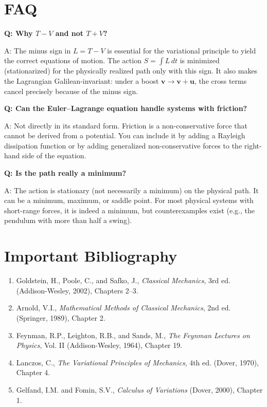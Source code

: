 \section*{FAQ}

\textbf{Q: Why $T - V$ and not $T + V$?}

A: The minus sign in $L = T - V$ is essential for the variational principle to yield the correct equations of motion. The action $S = \int L\,dt$ is minimized (stationarized) for the physically realized path only with this sign. It also makes the Lagrangian Galilean-invariant: under a boost $\mathbf{v} \to \mathbf{v} + \mathbf{u}$, the cross terms cancel precisely because of the minus sign.

\textbf{Q: Can the Euler--Lagrange equation handle systems with friction?}

A: Not directly in its standard form. Friction is a non-conservative force that cannot be derived from a potential. You can include it by adding a Rayleigh dissipation function or by adding generalized non-conservative forces to the right-hand side of the equation.

\textbf{Q: Is the path really a minimum?}

A: The action is stationary (not necessarily a minimum) on the physical path. It can be a minimum, maximum, or saddle point. For most physical systems with short-range forces, it is indeed a minimum, but counterexamples exist (e.g., the pendulum with more than half a swing).
\section*{Important Bibliography}

\begin{enumerate}
\item Goldstein, H., Poole, C., and Safko, J., \textit{Classical Mechanics}, 3rd ed. (Addison-Wesley, 2002), Chapters 2--3.
\item Arnold, V.I., \textit{Mathematical Methods of Classical Mechanics}, 2nd ed. (Springer, 1989), Chapter 2.
\item Feynman, R.P., Leighton, R.B., and Sands, M., \textit{The Feynman Lectures on Physics}, Vol. II (Addison-Wesley, 1964), Chapter 19.
\item Lanczos, C., \textit{The Variational Principles of Mechanics}, 4th ed. (Dover, 1970), Chapter 4.
\item Gelfand, I.M. and Fomin, S.V., \textit{Calculus of Variations} (Dover, 2000), Chapter 1.
\end{enumerate}

